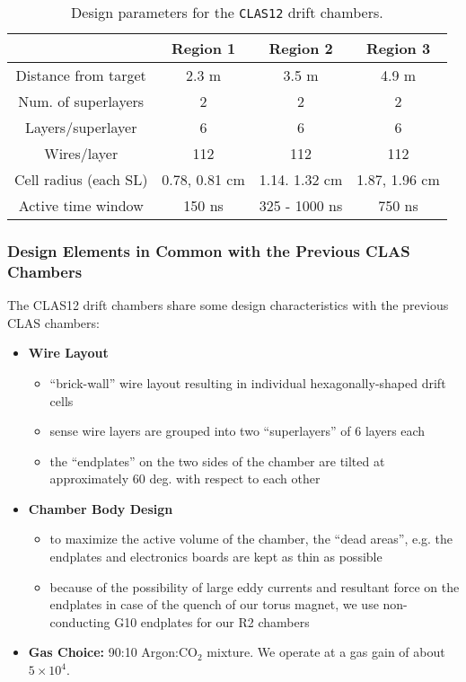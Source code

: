 \small{
\begin{table}[hbt]
\begin{center}
\begin{tabular}{||c|c|c|c||} \hline \hline
            &{\bf Region 1}&{\bf Region 2}&{\bf Region 3}\\ \hline
Distance from target & 2.3 m    & 3.5 m        & 4.9 m    \\ \hline
Num. of superlayers  & 2        & 2            & 2        \\ \hline
Layers/superlayer    & 6        & 6            & 6        \\ \hline
Wires/layer          & 112      & 112          & 112      \\ \hline
Cell radius (each SL) & 0.78, 0.81 cm  & 1.14. 1.32 cm      & 1.87, 1.96 cm  \\ \hline
Active time window   & 150 ns   & 325 - 1000 ns & 750 ns   \\ \hline
\end{tabular}
\caption{\small{Design parameters for the {\tt CLAS12} drift chambers.}}
\label{fwd-dc-design-parms}
\end{center}
\end{table}
}

\subsubsection{Design Elements in Common with the Previous CLAS Chambers}
The CLAS12 drift chambers share some design characteristics with the
previous CLAS chambers:
\begin{itemize}
\item {\bf Wire Layout}
\begin{itemize}
\item ``brick-wall'' wire layout resulting in individual hexagonally-shaped
drift cells
\item sense wire layers are grouped into two ``superlayers'' of 6 layers each
\item the ``endplates'' on the two sides of the chamber are tilted 
at approximately 60 deg. with respect to each other
\end{itemize}
\item {\bf Chamber Body Design}
\begin{itemize}
\item to maximize the active volume of the chamber, the ``dead areas'', e.g.
the endplates and electronics boards are kept as thin as possible
\item because of the possibility of large eddy currents and resultant
force on the endplates in case of the quench of our torus magnet, we
use non-conducting G10 endplates for our R2 chambers
\end{itemize}
\item {\bf Gas Choice:} 90:10 Argon:CO$_2$ mixture.  We operate at a gas gain of 
about $5 \times 10^4$.
\end{itemize}


